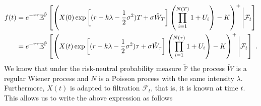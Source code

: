 \documentclass[times, utf8, diplomski]{fer}
\begin{document}
\begin{align*}
	f(t) &= e^{-r\tau} \mathbb{E}^{\tilde{\mathbb{P}}}\left[\left(X(0)\exp\left[ (r - k\lambda- \frac{1}{2}\sigma^2)T + \sigma \tilde{W}_{T} \right]\left(\prod_{i=1}^{N(T)}1+U_i\right) - K \right)^+\Bigg|\mathcal{F}_t\right] \\
		 &= e^{-r\tau} \mathbb{E}^{\tilde{\mathbb{P}}}\left[\left(X(t)\exp\left[ (r - k\lambda- \frac{1}{2}\sigma^2)\tau + \sigma \tilde{W}_{\tau} \right]\left(\prod_{i=1}^{N(\tau)}1+U_i\right) - K \right)^+\Bigg|\mathcal{F}_t\right] \hspace{0.1cm}. \\
\end{align*} We know that under the risk-neutral probability measure $\tilde{\mathbb{P}}$ the process $\tilde{W}$ is a regular Wiener process and $N$ is a Poisson process with the same intensity $\lambda$. Furthermore, $X(t)$ is adapted to filtration $\mathcal{F}_t$, that is, it is known at time $t$. This allows us to write the above expression as follows
\end{document}
